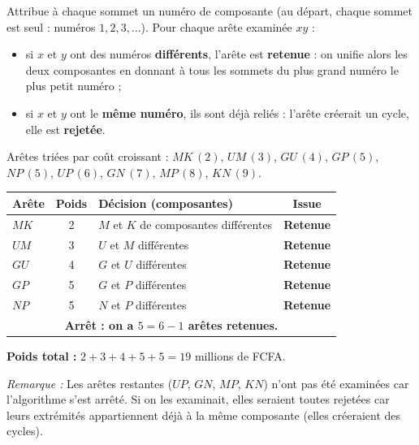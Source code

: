 \documentclass[11pt]{article}
\newcommand{\cle}[1]{{\popxbold\color{popdark}#1}}
\begin{document}
\begin{methode}
Attribue à chaque sommet un \cle{numéro de composante} (au départ, chaque sommet est seul : numéros $1, 2, 3, \dots$). Pour chaque arête examinée $xy$ :
\begin{itemize}
\item si $x$ et $y$ ont des numéros \textbf{différents}, l'arête est \textbf{retenue} : on unifie alors les deux composantes en donnant à tous les sommets du plus grand numéro le plus petit numéro ;
\item si $x$ et $y$ ont le \textbf{même numéro}, ils sont déjà reliés : l'arête créerait un cycle, elle est \textbf{rejetée}.
\end{itemize}
\end{methode}

\begin{exemplebox}
Arêtes triées par coût croissant : $MK\,(2)$, $UM\,(3)$, $GU\,(4)$, $GP\,(5)$, $NP\,(5)$, $UP\,(6)$, $GN\,(7)$, $MP\,(8)$, $KN\,(9)$.

\begin{center}
\begin{tabularx}{\linewidth}{|l|c|X|c|}
\hline
\rowcolor{popblueL} Arête & Poids & Décision (composantes) & Issue \\
\hline
$MK$ & 2 & $M$ et $K$ de composantes différentes & \textbf{Retenue} \\
\hline
$UM$ & 3 & $U$ et $M$ différentes & \textbf{Retenue} \\
\hline
$GU$ & 4 & $G$ et $U$ différentes & \textbf{Retenue} \\
\hline
$GP$ & 5 & $G$ et $P$ différentes & \textbf{Retenue} \\
\hline
$NP$ & 5 & $N$ et $P$ différentes & \textbf{Retenue} \\
\hline
\multicolumn{4}{|c|}{\textbf{Arrêt : on a $5 = 6-1$ arêtes retenues.}} \\
\hline
\end{tabularx}
\end{center}

\textbf{Poids total :} $2+3+4+5+5 = 19$ millions de FCFA.

\emph{Remarque :} Les arêtes restantes ($UP$, $GN$, $MP$, $KN$) n'ont pas été examinées car l'algorithme s'est arrêté. Si on les examinait, elles seraient toutes rejetées car leurs extrémités appartiennent déjà à la même composante (elles créeraient des cycles).
\end{exemplebox}
\end{document}
